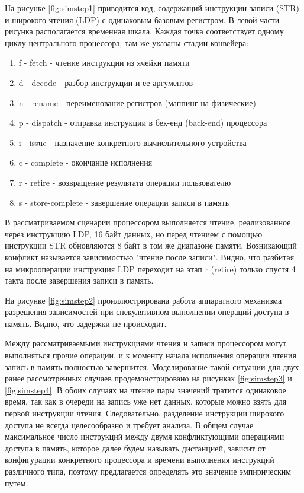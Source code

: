 На рисунке \ref{fig:simstep1} приводится код, содержащий инструкции записи (STR) и  широкого чтения (LDP) с одинаковым базовым регистром. 
В левой части рисунка располагается временная шкала. Каждая точка соответствует одному циклу центрального процессора, там же указаны стадии конвейера:
\begin{enumerate}
\item f - fetch - чтение инструкции из ячейки памяти 
\item d - decode - разбор инструкции и ее аргументов
\item n - rename - переименование регистров (маппинг на физические)
\item p - dispatch - отправка инструкции в бек-енд (back-end) процессора
\item i - issue - назначение конкретного вычислительного устройства
\item c - complete - окончание исполнения
\item r - retire - возвращение результата операции пользователю
\item s - store-complete - завершение операции записи в память 
\end{enumerate}

В рассматриваемом сценарии процессором выполняется чтение, реализованное через инструкцию LDP, 16 байт данных, но перед чтением с помощью инструкции STR обновляются 8 байт в том же диапазоне памяти. Возникающий конфликт называется зависимостью "чтение после записи". Видно, что разбитая на микрооперации инструкция LDP переходит на этап r (retire) только спустя 4 такта после завершения записи в память.





На рисунке \ref{fig:simstep2} проиллюстрирована работа  аппаратного механизма разрешения зависимостей при спекулятивном выполнении операций доступа в память. Видно, что задержки не происходит.

Между рассматриваемыми инструкциями чтения и записи процессором могут выполняться прочие операции, и к моменту начала исполнения операции чтения запись в память полностью завершится. Моделирование такой ситуации для двух ранее рассмотренных случаев продемонстрировано на рисунках \ref{fig:simstep3} и \ref{fig:simstep4}. В обоих случаях на чтение пары значений тратится одинаковое время, так как в очереди на запись уже нет данных, которые можно взять для первой инструкции чтения. Следовательно, разделение инструкции широкого доступа не всегда целесообразно и требует анализа. В общем случае максимальное число инструкций между двумя конфликтующими операциями доступа в память, которое далее будем называть дистанцией, зависит от конфигурации конкретного процессора и времени выполнения инструкций различного типа, поэтому предлагается определять это значение эмпирическим путем.

